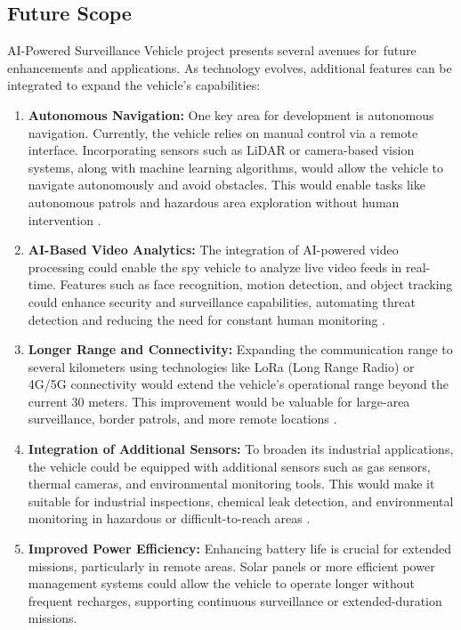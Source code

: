 \documentclass[12pt,a4paper]{report}
\begin{document}
\label{Future Scope}
\subsection{Future Scope}
AI-Powered Surveillance Vehicle project presents several avenues for future enhancements and applications. As technology evolves, additional features can be integrated to expand the vehicle's capabilities:

\begin{enumerate}
    \item \textbf{Autonomous Navigation:} 
    One key area for development is autonomous navigation. Currently, the vehicle relies on manual control via a remote interface. Incorporating sensors such as LiDAR or camera-based vision systems, along with machine learning algorithms, would allow the vehicle to navigate autonomously and avoid obstacles. This would enable tasks like autonomous patrols and hazardous area exploration without human intervention \cite{anymal}.
    
    \item \textbf{AI-Based Video Analytics:} 
    The integration of AI-powered video processing could enable the spy vehicle to analyze live video feeds in real-time. Features such as face recognition, motion detection, and object tracking could enhance security and surveillance capabilities, automating threat detection and reducing the need for constant human monitoring \cite{homl}.
    
    \item \textbf{Longer Range and Connectivity:} 
    Expanding the communication range to several kilometers using technologies like LoRa (Long Range Radio) or 4G/5G connectivity would extend the vehicle's operational range beyond the current 30 meters. This improvement would be valuable for large-area surveillance, border patrols, and more remote locations \cite{iot}.
    
    \item \textbf{Integration of Additional Sensors:} 
    To broaden its industrial applications, the vehicle could be equipped with additional sensors such as gas sensors, thermal cameras, and environmental monitoring tools. This would make it suitable for industrial inspections, chemical leak detection, and environmental monitoring in hazardous or difficult-to-reach areas \cite{3dprinting}.
    
    \item \textbf{Improved Power Efficiency:} 
    Enhancing battery life is crucial for extended missions, particularly in remote areas. Solar panels or more efficient power management systems could allow the vehicle to operate longer without frequent recharges, supporting continuous surveillance or extended-duration missions.
    

\end{enumerate}
\end{document}
